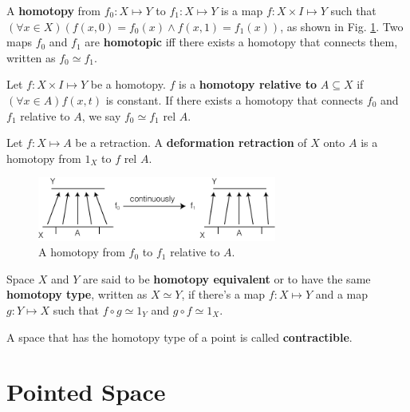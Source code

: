 \documentclass[12pt]{book}
\begin{document}
\begin{definition}
	A {\bf homotopy} from $f_0:X\mapsto Y$ to $f_1:X\mapsto Y$ is a map $f:X\times I\mapsto Y$ such that $(\forall x\in X)(f(x,0)=f_0(x)\wedge f(x,1)=f_1(x))$, as shown in Fig. \ref{fig:homotopy}. Two maps $f_0$ and $f_1$ are {\bf homotopic} iff there exists a homotopy that connects them, written as $f_0\simeq f_1$.
\end{definition}

\begin{definition}
	Let $f:X\times I\mapsto Y$ be a homotopy. $f$ is a {\bf homotopy relative to} $A\subseteq X$ if $(\forall x\in A)f(x,t)$ is constant. If there exists a homotopy that connects $f_0$ and $f_1$ relative to $A$, we say $f_0\simeq f_1$ rel $A$.
\end{definition}

\begin{definition}
	Let $f:X\mapsto A$ be a retraction. A {\bf deformation retraction} of $X$ onto $A$ is a homotopy from $1_X$ to $f$ rel $A$.
\end{definition}

\begin{figure}[htb!]
	\centering  
	\includegraphics[width=0.7\textwidth ]{resources/chap_bas_cstr/homotopy.pdf}  
	\caption{A homotopy from $f_0$ to $f_1$ relative to $A$.}
	\label{fig:homotopy}
\end{figure}

\begin{definition}
	Space $X$ and $Y$ are said to be {\bf homotopy equivalent} or to have the same {\bf homotopy type}, written as $X\simeq Y$, if there's a map $f:X\mapsto Y$ and a map $g:Y\mapsto X$ such that $f\circ g\simeq 1_Y$ and $g\circ f\simeq 1_X$.
\end{definition}

\begin{definition}
	A space that has the homotopy type of a point is called {\bf contractible}.
\end{definition}

\section{Pointed Space}
\end{document}
